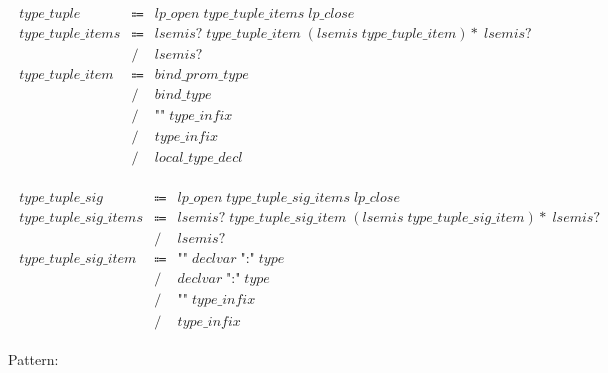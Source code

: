 \begin{align*}
    \begin{array}{rcll}
        \mathit{type\_tuple}
        &\Coloneq &\mathit{lp\_open}\; \mathit{type\_tuple\_items}\; \mathit{lp\_close} \\
        \mathit{type\_tuple\_items}
        &\Coloneq &\mathit{lsemis}{?}\; \mathit{type\_tuple\_item}\; (\mathit{lsemis}\; \mathit{type\_tuple\_item}){*}\; \mathit{lsemis}{?} \\
        &\mathrel{/} &\mathit{lsemis}{?} \\
        \mathit{type\_tuple\_item}
        &\Coloneq &\mathit{bind\_prom\_type} \\
        &\mathrel{/} &\mathit{bind\_type} \\
        &\mathrel{/} &\texttt{"\^{}"}\; \mathit{type\_infix} \\
        &\mathrel{/} &\mathit{type\_infix} \\
        &\mathrel{/} &\mathit{local\_type\_decl}
    \end{array}
\end{align*}

\begin{align*}
    \begin{array}{rcll}
        \mathit{type\_tuple\_sig}
        &\Coloneq &\mathit{lp\_open}\; \mathit{type\_tuple\_sig\_items}\; \mathit{lp\_close} \\
        \mathit{type\_tuple\_sig\_items}
        &\Coloneq &\mathit{lsemis}{?}\; \mathit{type\_tuple\_sig\_item}\; (\mathit{lsemis}\; \mathit{type\_tuple\_sig\_item}){*}\; \mathit{lsemis}{?} \\
        &\mathrel{/} &\mathit{lsemis}{?} \\
        \mathit{type\_tuple\_sig\_item}
        &\Coloneq &\texttt{"\^{}"}\; \mathit{declvar}\; \texttt{":"}\; \mathit{type} \\
        &\mathrel{/} &\mathit{declvar}\; \texttt{":"}\; \mathit{type} \\
        &\mathrel{/} &\texttt{"\^{}"}\; \mathit{type\_infix} \\
        &\mathrel{/} &\mathit{type\_infix}
    \end{array}
\end{align*}

Pattern:

